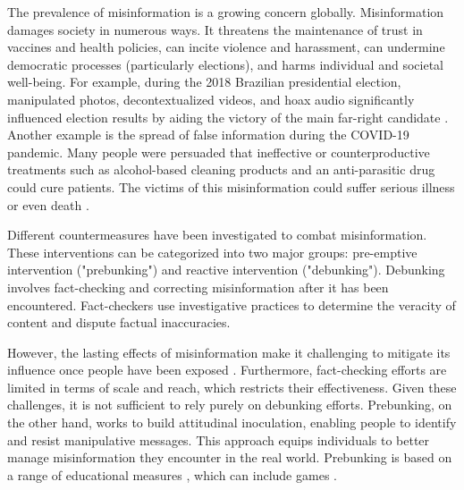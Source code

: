 The prevalence of misinformation is a growing concern globally. Misinformation damages society in numerous ways. It threatens the maintenance of trust in vaccines and health policies\cite{do2022infodemics,macdonald2023meme}, can incite violence and harassment\cite{cdtFromFellows}, can undermine democratic processes (particularly elections)\cite{bovet2019influence,groshek2017helping}, and harms individual and societal well-being\cite{verma2022examining}. For example, during the 2018 Brazilian presidential election, manipulated photos, decontextualized videos, and hoax audio significantly influenced election results by aiding the victory of the main far-right candidate \cite{theguardianWhatsAppFake,santos2020social}. Another example is the spread of false information during the COVID-19 pandemic. Many people were persuaded that ineffective or counterproductive treatments such as alcohol-based cleaning products and an anti-parasitic drug could cure patients. The victims of this misinformation could suffer serious illness or even death \cite{bbcHundredsDead}.

Different countermeasures have been investigated to combat misinformation. These interventions can be categorized into two major groups: pre-emptive intervention ("prebunking") and reactive intervention ("debunking")\cite{ecker2022psychological}. Debunking involves fact-checking and correcting misinformation after it has been encountered. Fact-checkers use investigative practices to determine the veracity of content and dispute factual inaccuracies\cite{juneja2022human}.  %

However, the lasting effects of misinformation make it challenging to mitigate its influence once people have been exposed \cite{roets2017fake,lewandowsky2012misinformation}. Furthermore, fact-checking efforts are limited in terms of scale and reach, which restricts their effectiveness\cite{roozenbeek2020prebunking}. Given these challenges, it is not sufficient to rely purely on debunking efforts. Prebunking, on the other hand, works to build attitudinal inoculation, enabling people to identify and resist manipulative messages. This approach equips individuals to better manage misinformation they encounter in the real world\cite{prebin2024}. Prebunking is based on a range of educational measures \cite{dame2022combating,cook2017neutralizing}, which can include games \cite{roozenbeek2019fake,cook2023cranky}.

